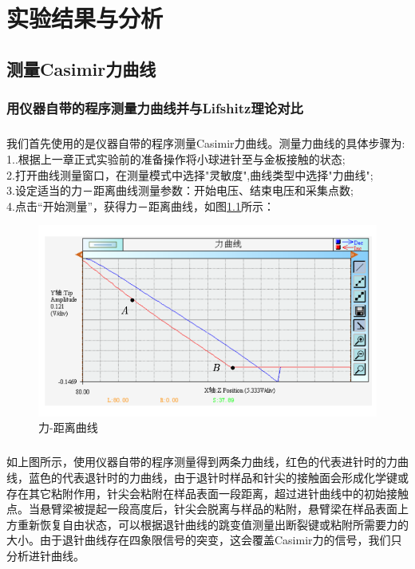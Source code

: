 
\chapter{实验结果与分析}

\section{测量Casimir力曲线}
\subsection{用仪器自带的程序测量力曲线并与Lifshitz理论对比}
\paragraph*{}
我们首先使用的是仪器自带的程序测量Casimir力曲线。测量力曲线的具体步骤为:
\\1..根据上一章正式实验前的准备操作将小球进针至与金板接触的状态;
\\2.打开曲线测量窗口，在测量模式中选择"灵敏度",曲线类型中选择"力曲线";
\\3.设定适当的力－距离曲线测量参数：开始电压、结束电压和采集点数;
\\4.点击“开始测量”，获得力－距离曲线，如图\ref{fig:11}所示：
\begin{figure}
	\centering
	\includegraphics[width=0.7\linewidth]{figures/力曲线}
	\caption{力-距离曲线}
	\label{fig:11}
\end{figure}
\paragraph*{}
如上图所示，使用仪器自带的程序测量得到两条力曲线，红色的代表进针时的力曲线，蓝色的代表退针时的力曲线，由于退针时样品和针尖的接触面会形成化学键或存在其它粘附作用，针尖会粘附在样品表面一段距离，超过进针曲线中的初始接触点。当悬臂梁被提起一段高度后，针尖会脱离与样品的粘附，悬臂梁在样品表面上方重新恢复自由状态，可以根据退针曲线的跳变值测量出断裂键或粘附所需要力的大小。由于退针曲线存在四象限信号的突变，这会覆盖Casimir力的信号，我们只分析进针曲线。
